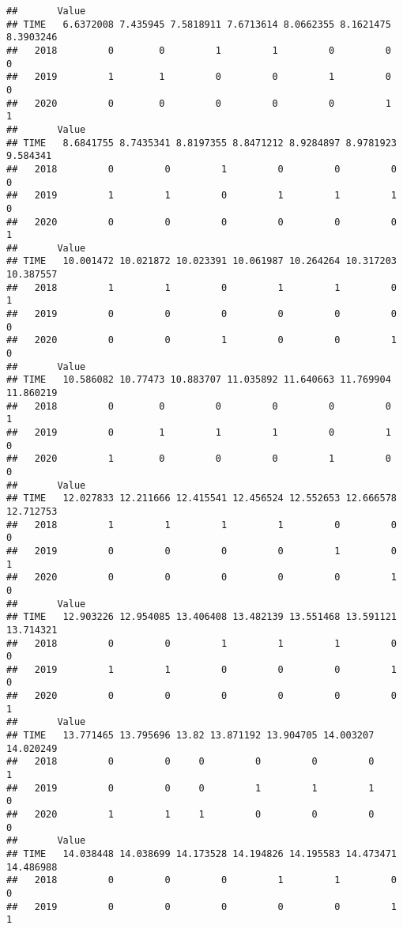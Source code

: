 \documentclass[
  12pt,
]{article}
\begin{document}
\begin{verbatim}
##       Value
## TIME   6.6372008 7.435945 7.5818911 7.6713614 8.0662355 8.1621475 8.3903246
##   2018         0        0         1         1         0         0         0
##   2019         1        1         0         0         1         0         0
##   2020         0        0         0         0         0         1         1
##       Value
## TIME   8.6841755 8.7435341 8.8197355 8.8471212 8.9284897 8.9781923 9.584341
##   2018         0         0         1         0         0         0        0
##   2019         1         1         0         1         1         1        0
##   2020         0         0         0         0         0         0        1
##       Value
## TIME   10.001472 10.021872 10.023391 10.061987 10.264264 10.317203 10.387557
##   2018         1         1         0         1         1         0         1
##   2019         0         0         0         0         0         0         0
##   2020         0         0         1         0         0         1         0
##       Value
## TIME   10.586082 10.77473 10.883707 11.035892 11.640663 11.769904 11.860219
##   2018         0        0         0         0         0         0         1
##   2019         0        1         1         1         0         1         0
##   2020         1        0         0         0         1         0         0
##       Value
## TIME   12.027833 12.211666 12.415541 12.456524 12.552653 12.666578 12.712753
##   2018         1         1         1         1         0         0         0
##   2019         0         0         0         0         1         0         1
##   2020         0         0         0         0         0         1         0
##       Value
## TIME   12.903226 12.954085 13.406408 13.482139 13.551468 13.591121 13.714321
##   2018         0         0         1         1         1         0         0
##   2019         1         1         0         0         0         1         0
##   2020         0         0         0         0         0         0         1
##       Value
## TIME   13.771465 13.795696 13.82 13.871192 13.904705 14.003207 14.020249
##   2018         0         0     0         0         0         0         1
##   2019         0         0     0         1         1         1         0
##   2020         1         1     1         0         0         0         0
##       Value
## TIME   14.038448 14.038699 14.173528 14.194826 14.195583 14.473471 14.486988
##   2018         0         0         0         1         1         0         0
##   2019         0         0         0         0         0         1         1

\end{verbatim}
\end{document}
